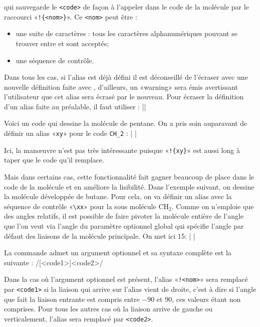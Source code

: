 \documentclass[10pt,french]{article}
\makeatletter
\newcommand\make@car@active[1]{%
	\catcode`#1\active
	\begingroup
		\lccode`\~`#1\relax
		\lowercase{\endgroup\def~}%
}
\newif\if@exstar
\newcommand\exemple{%
	\begingroup
	\parskip\z@
	\@makeother\;\@makeother\!\@makeother\?\@makeother\:%
	\@ifstar{\@exstartrue\exemple@}{\@exstarfalse\exemple@}}
\newcommand\exemple@[2][65]{%
	\medbreak\noindent
	\begingroup
		\let\do\@makeother\dospecials
		\make@car@active\ { {}}%
		\make@car@active\^^M{\par\leavevmode}%
		\make@car@active\^^I{\space\space}%
		\make@car@active\,{\leavevmode\kern\z@\string,}%
		\make@car@active\-{\leavevmode\kern\z@\string-}%
		\make@car@active\>{\leavevmode\kern\z@\string>}%
		\make@car@active\<{\leavevmode\kern\z@\string<}%
		\exemple@@{#1}{#2}%
}
\newcommand\exemple@@[3]{%
	\def\@tempa##1#3{\exemple@@@{#1}{#2}{##1}}%
	\@tempa
}
\newcommand\exemple@@@[3]{%
	\xdef\the@code{#3}%
	\endgroup
	\if@exstar
		\begingroup
			\fboxrule0.4pt
			\let\breakboxparindent\z@
			\def\bkvz@bottom{\hrule\@height\fboxrule}%
			\let\bkvz@before@breakbox\relax
			\def\bkvz@set@linewidth{\advance\linewidth\dimexpr-2\fboxrule-2\fboxsep}%
			\def\bkvz@left{\vrule\@width\fboxrule\hskip\fboxsep}%
			\def\bkvz@right{\hskip\fboxsep\vrule\@width\fboxrule}%
			\def\bkvz@top{\hbox to \hsize{%
				\vrule\@width\fboxrule\@height\fboxrule
				\leaders\bkvz@bottom\hfill
				\sffamily
				\fboxsep\z@
				\colorbox{black}{\kern0.25em\color{white}\footnotesize\lower0.5ex\hbox{\strut#2}\kern0.25em}%
				\leaders\bkvz@bottom\hfill
				\vrule\@width\fboxrule\@height\fboxrule}}%
			\breakbox
				\kern.5ex\relax
				\ttfamily\footnotesize\the@code\par
				\normalfont
				\kern3pt
				\hrule height0.1pt width\linewidth depth0.1pt
				\vskip5pt
				\rightskip0pt plus 1fill
				\everypar{{\color{lightgray}\rlap{\vrule height0.1pt width\linewidth depth0.1pt}}\hskip0pt plus 1fill}%
				\newlinechar`\^^M\everyeof{\noexpand}\scantokens{#3}\par
			\endbreakbox
		\endgroup
	\else
		\vskip0.5ex
		\boxput*(0,1)
			{\fboxsep\z@
			\hbox{\sffamily\colorbox{black}{\leavevmode\kern0.25em{\color{white}\footnotesize\strut#2}\kern0.25em}}%
			}%
			{\fboxsep5pt
			\fbox{%
				$\vcenter{\hsize\dimexpr0.#1\linewidth-\fboxsep-\fboxrule\relax
					\kern5pt\parskip0pt \ttfamily\footnotesize\the@code}%
				\vcenter{\kern5pt\hsize\dimexpr\linewidth-0.#1\linewidth-\fboxsep-\fboxrule\relax
					\everypar{{\color{lightgray}\rlap{\vrule height0.1pt width\dimexpr\linewidth-0.#1\linewidth-\fboxsep-\fboxrule depth0.1pt}}}%
					\footnotesize\newlinechar`\^^M\everyeof{\noexpand}\scantokens{#3}}$%
				}%
			}%
	\fi
	\medbreak
	\endgroup
}
\newcommand\falseverb[1]{{\ttfamily\detokenize\expandafter{\string#1}}}
\let\do\@makeother\dospecials
\makeatother
\begin{document}
qui sauvegarde le \verb/<code>/ de façon à l'appeler dans le code de la molécule par le raccourci «\verb/!{<nom>}/». Ce \verb-<nom>- peut être :
\begin{itemize}
	\item une suite de caractères : tous les caractères alphanumériques pouvant se trouver entre \texttt{\string\csname} et \texttt{\string\endcsname} sont acceptés;
	\item une séquence de contrôle.
\end{itemize}

Dans tous les cas, si l'alias est déjà défini il est déconseillé de l'écraser avec une nouvelle définition faite avec \falseverb{\definesubmol}, d'ailleurs, un «warning» sera émis avertissant l'utilisateur que cet alias sera écrasé par le nouveau. Pour écraser la définition d'un alias faite au préalable, il faut utiliser :\label{redefinesubmol}
\centerverb||
\smallskip

Voici un code qui dessine la molécule de pentane. On a pris soin auparavant de définir un alias «\verb/xy/» pour le code \verb/CH_2/ :
\exemple{Pentane}|
|

Ici, la manœuvre n'est pas très intéressante puisque «\verb/!{xy}/» est aussi long à taper que le code qu'il remplace.

Mais dans certains cas, cette fonctionnalité fait gagner beaucoup de place dans le code de la molécule et en améliore la lisibilité. Dans l'exemple suivant, on dessine la molécule développée de butane. Pour cela, on va définir un alias avec la séquence de contrôle «\verb/\xx/» pour la sous molécule $\mathrm{CH_2}$. Comme on n'emploie que des angles relatifs, il est possible de faire pivoter la molécule entière de l'angle que l'on veut via l'angle du paramètre optionnel global qui spécifie l'angle par défaut des liaisons de la molécule principale. On met ici 15\degres :
\exemple{Butane}|
|

La commande \falseverb{\definesubmol} admet un argument optionnel et sa syntaxe complète est la suivante :
\centerverb/[<code1>]{<code2>}/
\medskip

Dans la cas où l'argument optionnel est présent, l'alias «\verb-!<nom>-» sera remplacé par \verb'<code1>' si la liaison qui arrive sur l'alias vient de droite, c'est à dire si l'angle que fait la liaison entrante est compris entre $-90$\degres{} et 90\degres{}, ces valeurs étant non comprises. Pour tous les autres cas où la liaison arrive de gauche ou verticalement, l'alias sera remplacé par \verb-<code2>-.
\end{document}

